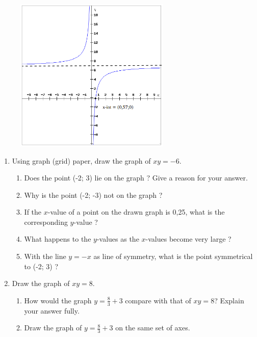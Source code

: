 {\begin{mdframed}[linewidth=4, leftmargin=40, rightmargin=40]
\begin{exercise}
\begin{enumerate}[noitemsep, label=\textbf{Step} \textbf{\arabic*}. ]
\begin{figure}[H]
\begin{center}
\label{m39341*uid12479!!!underscore!!!media}\label{m39341*uid12479!!!underscore!!!printimage}\includegraphics[width=280px]{col11306.imgs/m39341_hyperbola1.png} %
\vspace{2pt}
\vspace{.1in}
\end{center}
\end{figure}       
\end{enumerate}
\end{exercise}
\end{mdframed}
}
\noindent
\label{m39341*secfhsst!!!underscore!!!id3460}
\nopagebreak
\label{m39341*id249267}\begin{enumerate}[noitemsep, label=\textbf{\arabic*}. ] 
\label{m39341*uid163}\item Using graph (grid) paper, draw the graph of $xy=-6$.
\label{m39341*id249301}\begin{enumerate}[noitemsep, label=\textbf{\alph*}. ] 
\label{m39341*uid164}\item Does the point (-2; 3) lie on the graph ? Give a reason for your answer.
\label{m39341*uid165}\item Why is the point (-2; -3) not on the graph ?
\label{m39341*uid166}\item If the $x$-value of a point on the drawn graph is 0,25, what is the corresponding $y$-value ?
\label{m39341*uid167}\item What happens to the $y$-values as the $x$-values become very large ?
\label{m39341*uid168}\item With the line $y=-x$ as line of symmetry, what is the point symmetrical to (-2; 3) ?
\end{enumerate}
  \label{m39341*uid169}\item Draw the graph of $xy=8$.
\label{m39341*id249462}\begin{enumerate}[noitemsep, label=\textbf{\alph*}. ] 
\label{m39341*uid170}\item How would the graph $y=\frac{8}{3}+3$ compare with that of $xy=8$? Explain your answer fully.
\label{m39341*uid171}\item Draw the graph of $y=\frac{8}{3}+3$ on the same set of axes.
\end{enumerate}
  \end{enumerate}
